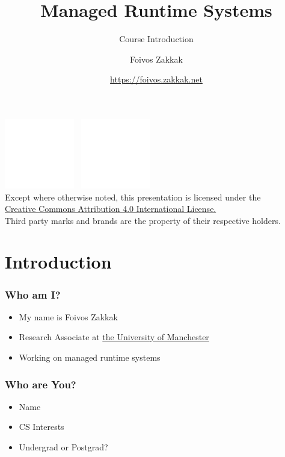 \documentclass[
14pt,
aspectratio=169,
usenames,
dvipsnames,
x11names]{beamer}
\title{Managed Runtime Systems}
\subtitle{Course Introduction}
\author[\url{https://foivos.zakkak.net}]{Foivos Zakkak}
\date{\url{https://foivos.zakkak.net}}
\begin{document}


\begin{frame}[plain]
  \titlepage
  \centering
  \includegraphics[height=.75cm]{cc}~
  \includegraphics[height=.75cm]{by}\\[1em]
  \scriptsize{Except where otherwise noted, this presentation is licensed under the\\
    \href{http://creativecommons.org/licenses/by/4.0/}%
    {Creative Commons Attribution 4.0 International License.}\\[1ex]
    Third party marks and brands are the property of their respective
    holders.}
\end{frame}


\section{Introduction}

\begin{frame}
  \frametitle{Who am I?}
  \begin{itemize} \setlength{\itemsep}{\fill}
  \item My name is \alert{Foivos Zakkak}
  \item Research Associate at \href{http://www.manchester.ac.uk/}{\alert{the University of Manchester}}
  \item Working on managed runtime systems
  \end{itemize}
\end{frame}

\begin{frame}
  \frametitle{Who are You?}
  \begin{itemize} \setlength{\itemsep}{\fill}
  \item Name
  \item CS Interests
  \item Undergrad or Postgrad?
  \end{itemize}
\end{frame}
\end{document}
